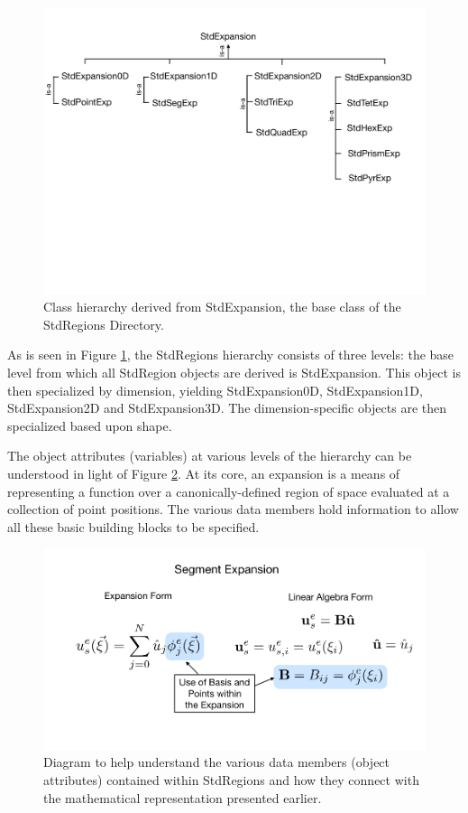 \begin{figure}[htb]
\centering
\includegraphics[width=6in]{img/stdexpansiontree.pdf}
\caption{Class hierarchy derived from StdExpansion, the base class of the StdRegions Directory.}
\label{stdregions:stdexpansiontree}
\end{figure}

As is seen in Figure \ref{stdregions:stdexpansiontree}, the StdRegions hierarchy consists of three levels:  the base level from which all
StdRegion objects are derived is StdExpansion.   This object is then specialized by dimension, yielding StdExpansion0D, 
StdExpansion1D, StdExpansion2D and StdExpansion3D.  The dimension-specific objects are then specialized based upon
shape.  

The object attributes (variables) at various levels of the hierarchy can be understood in light of Figure \ref{stdregions:stdexpansion}.
At its core, an expansion is a means of representing a function over a canonically-defined region of space evaluated at a collection of point positions.
The various data members hold information to allow all these basic building blocks to be specified.

\begin{figure}[htb]
\centering
\includegraphics[width=6in]{img/StdExpansion.png}
\caption{Diagram to help understand the various data members (object attributes) contained within StdRegions and how they connect with the mathematical representation presented earlier.}
\label{stdregions:stdexpansion}
\end{figure}


